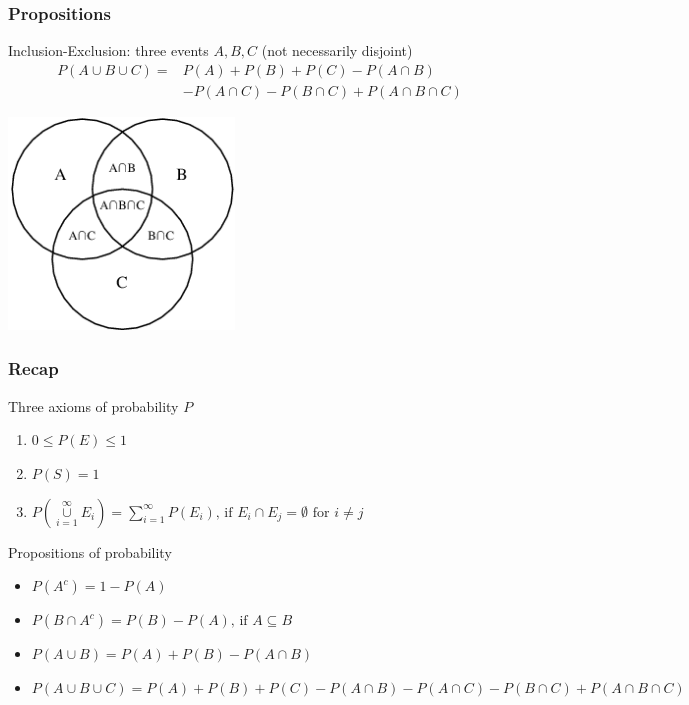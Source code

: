 \documentclass[slidestop,compress,mathserif]{beamer}
\begin{document}
\begin{frame}\frametitle{Propositions}
\begin{dinglist}{\DingListSymbolA}
\item Inclusion-Exclusion: three events $A, B, C$ (not necessarily disjoint)
  \begin{align*}
  P(A \cup B \cup C) = & P(A) + P(B) + P(C) - P(A \cap B) \\
                  		  & - P(A \cap C)  - P(B \cap C) + P(A \cap B \cap C)
  \end{align*}
\end{dinglist}
\begin{center}
\includegraphics[width=0.45\textwidth]{Figures/venn.png}
\end{center}


\end{frame}


\begin{frame}\frametitle{Recap}

Three axioms of probability $P$
\begin{enumerate}
\item $0 \leq P(E)  \leq 1$
\item $P(S) =  1$
\item $P\left(\underset{i=1}{\overset{\infty}{\cup}} E_i\right) = \sum_{i=1}^\infty P(E_i) \text{,  if } E_i \cap E_j=\emptyset \text{ for } i \neq j$
\end{enumerate}

\pause
Propositions of probability
\begin{itemize}
\item $P(A^c) = 1-P(A)$
\item $P(B \cap A^c) = P(B)-P(A) \text{, if } A \subseteq B$
\item $P(A \cup B) = P(A) + P(B) - P(A \cap B)$
\item $P(A \cup B \cup C) = P(A) + P(B) + P(C) - P(A \cap B) - P(A \cap C)  - P(B \cap C) + P(A \cap B \cap C)$
\end{itemize}


\end{frame}
\end{document}
